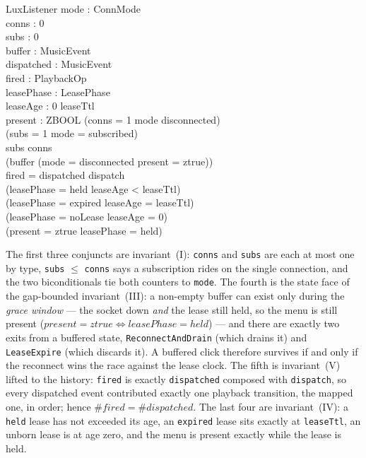 \documentclass[a4paper,10pt,fleqn]{article}
\begin{document}
\begin{schema}{LuxListener}
  mode : ConnMode \\
  conns : 0  \\
  subs : 0  \\
  buffer : \seq MusicEvent \\
  dispatched : \seq MusicEvent \\
  fired : \seq PlaybackOp \\
  leasePhase : LeasePhase \\
  leaseAge : 0 \upto leaseTtl \\
  present : ZBOOL
  \where
  (conns = 1 \iff mode \neq disconnected) \\
  (subs = 1 \iff mode = subscribed) \\
  subs \leq conns \\
  (buffer \neq \langle \rangle \implies (mode = disconnected \land present = ztrue)) \\
  fired = dispatched \comp dispatch \\
  (leasePhase = held \implies leaseAge < leaseTtl) \\
  (leasePhase = expired \implies leaseAge = leaseTtl) \\
  (leasePhase = noLease \implies leaseAge = 0) \\
  (present = ztrue \iff leasePhase = held)
\end{schema}

The first three conjuncts are invariant~(I): \texttt{conns} and \texttt{subs} are
each at most one by type, \texttt{subs} $\leq$ \texttt{conns} says a subscription
rides on the single connection, and the two biconditionals tie both counters to
\texttt{mode}. The fourth is the state face of the gap-bounded invariant~(III): a
non-empty buffer can exist only during the \emph{grace window} --- the socket
down \emph{and} the lease still held, so the menu is still present
($present = ztrue \iff leasePhase = held$) --- and there are exactly two exits
from a buffered state, \texttt{ReconnectAndDrain} (which drains it) and
\texttt{LeaseExpire} (which discards it). A buffered click therefore survives if
and only if the reconnect wins the race against the lease clock. The fifth is
invariant~(V) lifted to
the history: \texttt{fired} is exactly \texttt{dispatched} composed with
\texttt{dispatch}, so every dispatched event contributed exactly one playback
transition, the mapped one, in order; hence $\# fired = \# dispatched$. The last
four are invariant~(IV): a \texttt{held} lease has not exceeded its age, an
\texttt{expired} lease sits exactly at \texttt{leaseTtl}, an unborn lease is at
age zero, and the menu is present exactly while the lease is held.
\end{document}
